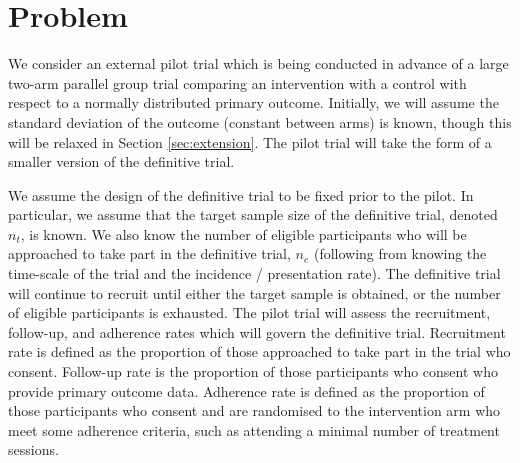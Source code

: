 \documentclass[AMA,STIX1COL]{WileyNJD-v2}
\begin{document}




\section{Problem}\label{sec:problem}

We consider an external pilot trial which is being conducted in advance of a large two-arm parallel group trial comparing an intervention with a control with respect to a normally distributed primary outcome. Initially, we will assume the standard deviation of the outcome (constant between arms) is known, though this will be relaxed in Section \ref{sec:extension}. The pilot trial will take the form of a smaller version of the definitive trial. 

We assume the design of the definitive trial to be fixed prior to the pilot. In particular, we assume that the target sample size of the definitive trial, denoted $n_t$, is known. We also know the number of eligible participants who will be approached to take part in the definitive trial, $n_e$ (following from knowing the time-scale of the trial and the incidence / presentation rate). The definitive trial will continue to recruit until either the target sample is obtained, or the number of eligible participants is exhausted. The pilot trial will assess the recruitment, follow-up, and adherence rates which will govern the definitive trial. Recruitment rate is defined as the proportion of those approached to take part in the trial who consent. Follow-up rate is the proportion of those participants who consent who provide primary outcome data. Adherence rate is defined as the proportion of those participants who consent and are randomised to the intervention arm who meet some adherence criteria, such as attending a minimal number of treatment sessions. 
\end{document}
